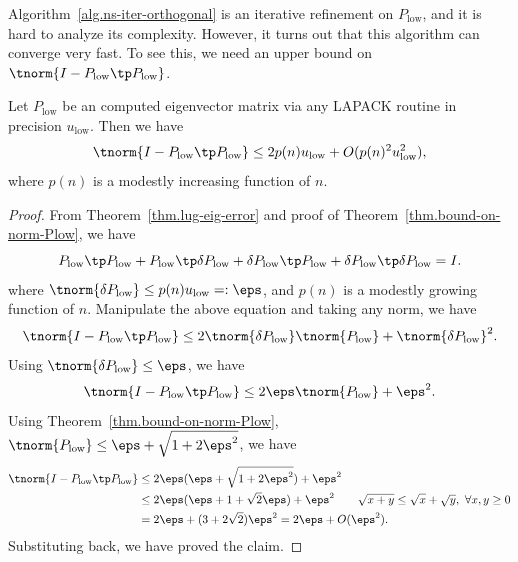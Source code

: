 \documentclass{article}
\numberwithin{equation}{section} %
\begin{document}
Algorithm~\ref{alg.ns-iter-orthogonal} is an iterative refinement on
$P_{\mathrm{low}}$, and it is hard to analyze its complexity. However, it
turns out that this algorithm can converge very fast.
To see this, we need an upper bound on $\tnorm{I - P_{\mathrm{low}}\tp
  P_{\mathrm{low}}}$. 

\begin{corollary}
\label{cor.bound-on-orthog}
Let $P_{\mathrm{low}}$ be an computed eigenvector matrix via any LAPACK
routine in precision $u_{\mathrm{low}}$. Then we have
\begin{equation}\notag
  \tnorm{I - P_{\mathrm{low}}\tp P_{\mathrm{low}}} \le
  2 p(n)u_{\mathrm{low}} + O(p(n)^{2}u_{\mathrm{low}}^{2}),
\end{equation}
where $p(n)$ is a modestly increasing function of $n$.
\end{corollary}
\begin{proof}
From Theorem~\ref{thm.lug-eig-error} and proof of
Theorem~\ref{thm.bound-on-norm-Plow}, we have
\begin{equation}\notag
  P_{\mathrm{low}}\tp P_{\mathrm{low}} + P_{\mathrm{low}}\tp
  \delta P_{\mathrm{low}} + \delta P_{\mathrm{low}} \tp 
  P_{\mathrm{low}} + \delta P_{\mathrm{low}} \tp \delta P_{\mathrm{low}} = I.
\end{equation}
where $\tnorm{\delta P_{\mathrm{low}}} \le p(n)u_{\mathrm{low}} =: \eps$,
and $p(n)$ is a modestly growing function of $n$.
Manipulate the above equation and taking any norm, we have
\begin{equation}\notag
  \tnorm{ I - P_{\mathrm{low}} \tp P_{\mathrm{low}} } \le
  2 \tnorm{\delta P_{\mathrm{low}}} \tnorm{P_{\mathrm{low}}} +
  \tnorm{\delta P_{\mathrm{low}}}^{2}.
\end{equation}
Using $\tnorm{\delta P_{\mathrm{low}}} \le \eps$, we have
\begin{equation}\notag
  \tnorm{I - P_{\mathrm{low}}\tp P_{\mathrm{low}}} \le
  2 \eps \tnorm{P_{\mathrm{low}}}  + \eps^{2}.
\end{equation}
Using Theorem~\ref{thm.bound-on-norm-Plow},
$\tnorm{P_{\mathrm{low}}} \le \eps + \sqrt{1 + 2\eps^{2}}$, we have 
\begin{equation}\notag
  \begin{aligned}
    \tnorm{I - P_{\mathrm{low}}\tp P_{\mathrm{low}}}
    & \le 2\eps (\eps + \sqrt{1 + 2\eps^{2}}) + \eps^{2} \\
    & \le 2\eps (\eps  + 1 + \sqrt{2}\eps) + \eps^{2}
      \qquad \sqrt{x + y} \le \sqrt{x} + \sqrt{y},\ \forall x, y \ge 0 \\
    & = 2 \eps + (3 + 2 \sqrt{2}) \eps^{2} = 2 \eps + O(\eps ^{2}). 
  \end{aligned}
\end{equation}
Substituting back, we have proved the claim.
\end{proof}
\end{document}
